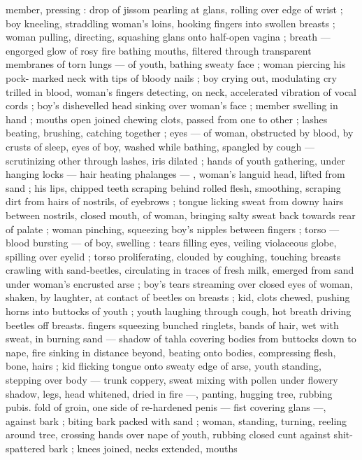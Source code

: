 member, pressing : drop of jissom pearling at glans, rolling over
edge of wrist ; boy kneeling, straddling woman's loins, hooking
fingers into swollen breasts ; woman pulling, directing, squashing
glans onto half-open vagina ; breath --- engorged glow of rosy fire
bathing mouths, filtered through transparent membranes of torn
lungs --- of youth, bathing sweaty face ; woman piercing his pock-
marked neck with tips of bloody nails ; boy crying out, modulating
cry trilled in blood, woman's fingers detecting, on neck, accelerated
vibration of vocal cords ; boy's dishevelled head sinking over
woman's face ; member swelling in hand ; mouths open joined
chewing clots, passed from one to other ; lashes beating, brushing,
catching together ; eyes --- of woman, obstructed by blood, by
crusts of sleep, eyes of boy, washed while bathing, spangled by
cough --- scrutinizing other through lashes, iris dilated ; hands of
youth gathering, under hanging locks --- hair heating phalanges ---
, woman's languid head, lifted from sand ; his lips, chipped teeth
scraping behind rolled flesh, smoothing, scraping dirt from hairs of
nostrils, of eyebrows ; tongue licking sweat from downy hairs
between nostrils, closed mouth, of woman, bringing salty sweat back
towards rear of palate ; woman pinching, squeezing boy's nipples
between fingers ; torso --- blood bursting --- of boy, swelling : tears
filling eyes, veiling violaceous globe, spilling over eyelid ; torso
proliferating, clouded by coughing, touching breasts crawling with
sand-beetles, circulating in traces of fresh milk, emerged from sand
under woman's encrusted arse ; boy's tears streaming over closed
eyes of woman, shaken, by laughter, at contact of beetles on breasts
; kid, clots chewed, pushing horns into buttocks of youth ; youth
laughing through cough, hot breath driving beetles off breasts.
fingers squeezing bunched ringlets, bands of hair, wet with sweat, in
burning sand --- shadow of tahla covering bodies from buttocks
down to nape, fire sinking in distance beyond, beating onto bodies,
compressing flesh, bone, hairs ; kid flicking tongue onto sweaty edge
of arse, youth standing, stepping over body --- trunk coppery, sweat
mixing with pollen under flowery shadow, legs, head whitened, dried
in fire ---, panting, hugging tree, rubbing pubis. fold of groin, one
side of re-hardened penis --- fist covering glans ---, against bark ;
biting bark packed with sand ; woman, standing, turning, reeling
around tree, crossing hands over nape of youth, rubbing closed cunt
against shit-spattered bark ; knees joined, necks extended, mouths
